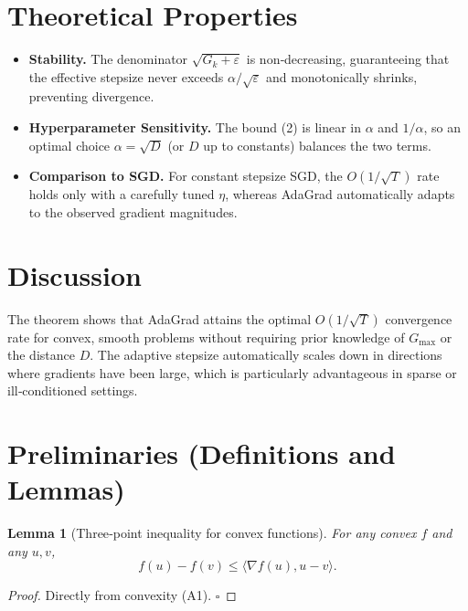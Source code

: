 \documentclass{article}
\newtheorem{lemma}{Lemma}
\begin{document}
\section*{Theoretical Properties}
\begin{itemize}
\item \textbf{Stability.} The denominator $\sqrt{G_k+\varepsilon}$ is non‑decreasing, guaranteeing that the effective stepsize never exceeds $\alpha/\sqrt{\varepsilon}$ and monotonically shrinks, preventing divergence.
\item \textbf{Hyperparameter Sensitivity.} The bound (2) is linear in $\alpha$ and $1/\alpha$, so an optimal choice $\alpha=\sqrt{D}$ (or $D$ up to constants) balances the two terms.
\item \textbf{Comparison to SGD.} For constant stepsize SGD, the $O(1/\sqrt{T})$ rate holds only with a carefully tuned $\eta$, whereas AdaGrad automatically adapts to the observed gradient magnitudes.
\end{itemize}

\section*{Discussion}
The theorem shows that AdaGrad attains the optimal $O(1/\sqrt{T})$ convergence rate for convex, smooth problems without requiring prior knowledge of $G_{\max}$ or the distance $D$. The adaptive stepsize automatically scales down in directions where gradients have been large, which is particularly advantageous in sparse or ill‑conditioned settings.

\section*{Preliminaries (Definitions and Lemmas)}
\begin{lemma}[Three‑point inequality for convex functions]\label{lem:3pt}
For any convex $f$ and any $u,v$,
\[
f(u)-f(v)\le \langle \nabla f(u),u-v\rangle .
\tag{3}
\]
\end{lemma}
\begin{proof}
Directly from convexity (A1). $\square$
\end{proof}
\end{document}

